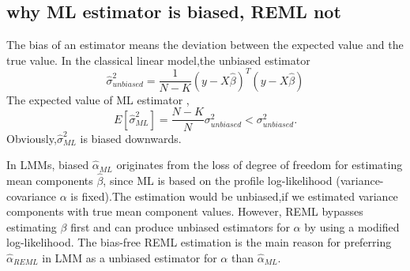\documentclass[12pt]{article}
\begin{document}
\subsection{why ML estimator is biased, REML not}
The bias of an estimator means the deviation between the expected value and the true value.
In the classical linear model,the unbiased estimator 
\begin{equation}
    {\hat{\sigma}}^2_{unbiased} = \frac1{N-K}(y-X\hat{\beta})^T(y-X\hat{\beta})
\end{equation}
The expected value of ML estimator \cite{[Verbeke and Molenberghs, 2009]},
\begin{equation}
E[{\hat{\sigma}}^ 2_{ML}] = \frac{N-K}{N}\sigma^2_{unbiased}<\sigma^2_{unbiased}.
\end{equation}
Obviously,${\hat{\sigma}}^ 2_{ML}$ is biased downwards.

In LMMs, biased $ \hat{\alpha}_{ML}$ originates from the loss of degree of freedom for estimating mean components $\hat{\beta}$, since ML is based on the profile log-likelihood (variance-covariance $\alpha$ is fixed).The estimation would be unbiased,if we estimated variance components with true mean component values. However, REML bypasses estimating $\beta$ first and can produce unbiased estimators for $\alpha$ by using a modified log-likelihood.
The bias-free REML estimation is the main reason for preferring $\hat\alpha_{REML}$ in LMM as a unbiased estimator for $\alpha$ than $\hat\alpha_{ML}$.
\end{document}
